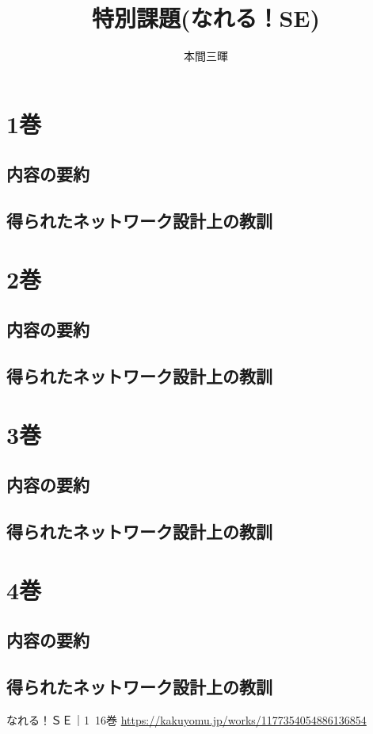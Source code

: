 \documentclass[titlepage,a4paper]{jsarticle}
\title{特別課題(なれる！SE)}
\author{本間三暉}
\begin{document}
\maketitle
\section{1巻}
\subsection{内容の要約}

\subsection{得られたネットワーク設計上の教訓}

\section{2巻}
\subsection{内容の要約}

\subsection{得られたネットワーク設計上の教訓}

\section{3巻}
\subsection{内容の要約}

\subsection{得られたネットワーク設計上の教訓}

\section{4巻}
\subsection{内容の要約}

\subsection{得られたネットワーク設計上の教訓}


\begin{thebibliography}{99}
なれる！ＳＥ｜1~16巻 \url{https://kakuyomu.jp/works/1177354054886136854}
\end{thebibliography}
\end{document}
